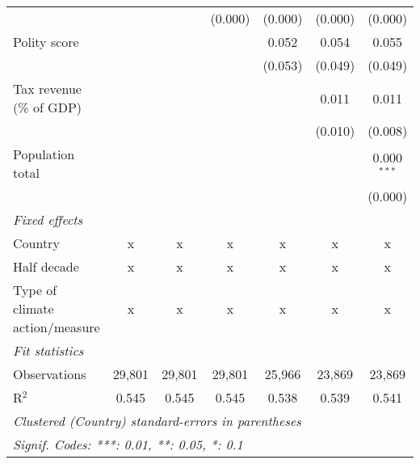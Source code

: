 \begin{tabular}{lcccccc}
                                                                           &              &               & (0.000)       & (0.000)        & (0.000)        & (0.000)\\   
   Polity score                                                            &              &               &               & 0.052          & 0.054          & 0.055\\   
                                                                           &              &               &               & (0.053)        & (0.049)        & (0.049)\\   
   Tax revenue (\% of GDP)                                                 &              &               &               &                & 0.011          & 0.011\\   
                                                                           &              &               &               &                & (0.010)        & (0.008)\\   
   Population total                                                        &              &               &               &                &                & 0.000$^{***}$\\   
                                                                           &              &               &               &                &                & (0.000)\\   
   \emph{Fixed effects}\\
   Country                                                                 & x            & x             & x             & x              & x              & x\\  
   Half decade                                                             & x            & x             & x             & x              & x              & x\\  
   Type of climate action/measure                                          & x            & x             & x             & x              & x              & x\\  
   \midrule \emph{Fit statistics}\\
   Observations                                                            & 29,801       & 29,801        & 29,801        & 25,966         & 23,869         & 23,869\\  
   R$^2$                                                                   & 0.545        & 0.545         & 0.545         & 0.538          & 0.539          & 0.541\\  
   \midrule
   \multicolumn{7}{l}{\emph{Clustered (Country) standard-errors in parentheses}}\\
   \multicolumn{7}{l}{\emph{Signif. Codes: ***: 0.01, **: 0.05, *: 0.1}}\\
\end{tabular}
\par\endgroup


